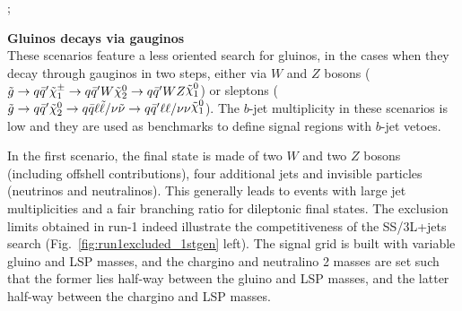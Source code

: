 ; 


\par{\bf Gluinos decays via gauginos\\}
These scenarios feature a less oriented search for gluinos, in the cases when they decay through gauginos in two steps, 
either via $W$ and $Z$ bosons ($\gluino\to q\bar{q}'\chargino\to q\bar{q}'W\tilde{\chi}_{2}^{0}\to q\bar{q}'WZ\ninoone$) 
or sleptons ($\gluino\to q\bar{q}'\tilde{\chi}_{2}^{0}  \to  q\bar{q}\ell\tilde\ell/\nu\tilde\nu  \to  q\bar{q}'\ell\ell/\nu\nu\ninoone$). 
The $b$-jet multiplicity in these scenarios is low and they are used as benchmarks to define signal regions with $b$-jet vetoes. 

In the first scenario, the final state is made of two $W$ and two $Z$ bosons (including offshell contributions), 
four additional jets and invisible particles (neutrinos and neutralinos). 
This generally leads to events with large jet multiplicities and a fair branching ratio for dileptonic final states. 
The exclusion limits obtained in run-1 indeed illustrate the competitiveness of the SS/3L+jets search (Fig.~\ref{fig:run1excluded_1stgen} left). 
The signal grid is built with variable gluino and LSP masses, 
and the chargino and neutralino 2 masses are set such that the former lies half-way between the gluino and LSP masses, 
and the latter half-way between the chargino and LSP masses. 

